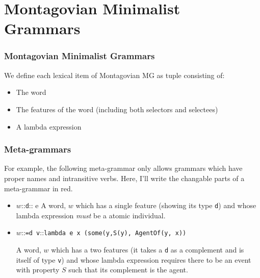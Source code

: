 \documentclass[aspectratio=169]{beamer}
\newcommand{\lex}[3]{{#1}::{\texttt{#2}}::{#3}}
\begin{document}
\section{Montagovian Minimalist Grammars}
\begin{frame}
\frametitle{Montagovian Minimalist Grammars}
We define each lexical item of Montagovian MG as tuple consisting of:
\begin{itemize}
  \item The word
  \item The features of the word (including both selectors and selectees)
  \item A lambda expression 
\end{itemize}
\end{frame}
%
%
%
\begin{frame}
  \frametitle{Meta-grammars}

For example, the following meta-grammar only allows grammars which have proper names and intransitive verbs. 
Here, I'll write the changable parts of a meta-grammar in {\color{red} red}.

\begin{itemize}
  \item \lex{\color{red} $w$}{d}{\color{red} e}\hspace{2em}
    A word, $w$  which has a single feature (showing its type \texttt{d}) and whose lambda expression \emph{must} be a atomic individual.
\item \lex{\color{red}$w$}{=d v}{\lstinline{lambda e x (some(y,}{\color{red}\lstinline{S}}\lstinline{(y), AgentOf(y, x))}} 

    A word, $w$ which has a two features (it takes a \texttt{d} as a complement and is itself of type \texttt{v}) and whose lambda expression requires there to be an event with property $S$ such that its complement is the agent.
\end{itemize}
\end{frame}
\end{document}
